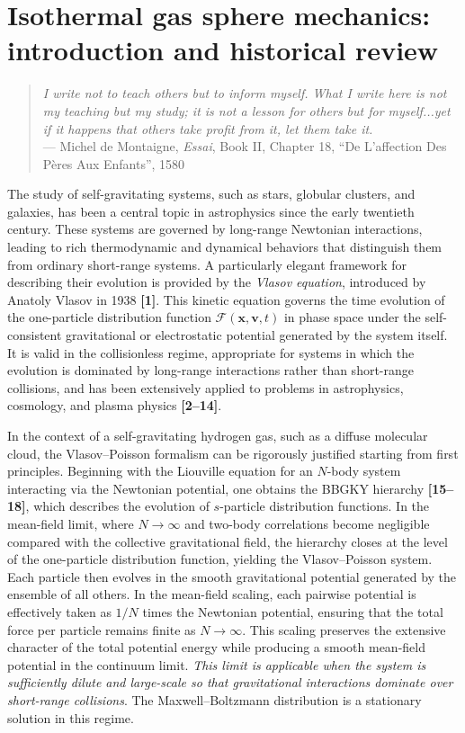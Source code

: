 \documentclass[12pt,a4paper]{article}
\numberwithin{equation}{section}
\begin{document}
\section{Isothermal gas sphere mechanics: introduction and historical
review}
\begin{quote}
\textit{I write not to teach others but to inform myself. What I write here is not my teaching but my study; it is not a lesson for others but for myself...yet if it happens that others take profit from it, let them take it.} \\
--- Michel de Montaigne, \textit{Essai}, Book II, Chapter 18, ``De L’affection Des Pères Aux Enfants'', 1580
\end{quote}
\noindent The study of self-gravitating systems, such as stars, globular clusters, and galaxies, has been a central topic in astrophysics since the early twentieth century. These systems are governed by long-range Newtonian interactions, leading to rich thermodynamic and dynamical behaviors that distinguish them from ordinary short-range systems. A particularly elegant framework for describing their evolution is provided by the \emph{Vlasov equation}, introduced by Anatoly Vlasov in 1938 \textbf{[1]}. This kinetic equation governs the time evolution of the one-particle distribution function $\mathcal{F}(\mathbf{x},\mathbf{v},t)$ in phase space under the self-consistent gravitational or electrostatic potential generated by the system itself. It is valid in the collisionless regime, appropriate for systems in which the evolution is dominated by long-range interactions rather than short-range collisions, and has been extensively applied to problems in astrophysics, cosmology, and plasma physics \textbf{[2--14]}.

In the context of a self-gravitating hydrogen gas, such as a diffuse molecular cloud, the Vlasov--Poisson formalism can be rigorously justified starting from first principles. Beginning with the Liouville equation for an $N$-body system interacting via the Newtonian potential, one obtains the BBGKY hierarchy \textbf{[15--18]}, which describes the evolution of $s$-particle distribution functions. In the mean-field limit, where $N \to \infty$ and two-body correlations become negligible compared with the collective gravitational field, the hierarchy closes at the level of the one-particle distribution function, yielding the Vlasov--Poisson system. Each particle then evolves in the smooth gravitational potential generated by the ensemble of all others. In the mean-field scaling, each pairwise potential is effectively taken as $1/N$ times the Newtonian potential, ensuring that the total force per particle remains finite as $N \to \infty$. This scaling preserves the extensive character of the total potential energy while producing a smooth mean-field potential in the continuum limit. \emph{This limit is applicable when the system is sufficiently dilute and large-scale so that gravitational interactions dominate over short-range collisions}. The Maxwell--Boltzmann distribution is a stationary solution in this regime. 
\end{document}
